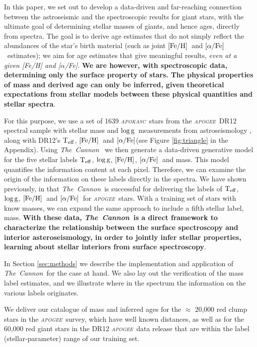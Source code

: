 \documentclass[12pt, preprint]{aastex}
\newcommand{\project}[1]{\textsl{#1}}
\newcommand{\tc}{\project{The~Cannon}}
\newcommand{\apogee}{\project{\textsc{apogee}}}
\newcommand{\apokasc}{\project{\textsc{apokasc}}}
\newcommand{\teff}{\mbox{$\rm T_{eff}$}}
\newcommand{\feh}{\mbox{$\rm [Fe/H]$}}
\newcommand{\alphafe}{\mbox{$\rm [\alpha/Fe]$}}
\newcommand{\logg}{\mbox{$\rm \log g$}}
\begin{document}
In this paper, we set out to develop a data-driven and far-reaching connection between the astroseismic and the spectroscopic results for giant stars, with the ultimate goal of determining stellar masses of giants, and hence ages, directly from spectra. The goal is to derive age estimates that do not simply reflect the abundances of the star's birth material (such as joint \feh\ and \alphafe\ estimates); we aim for age estimates that give meaningful results, {\sl even at a given [Fe/H] and [$\alpha$/Fe]}. \textbf{We are however, with spectroscopic data, determining only the surface property of stars. The physical properties of mass and derived age can only be inferred, given theoretical expectations from stellar models between these physical quantities and stellar spectra}.

For this purpose, we use a set of 1639 \apokasc\ stars from the \apogee\ DR12 spectral sample with stellar mass and \logg\ measurements from astroseismology \citep{P2014}, along with DR12's  \teff, \feh\ and \alphafe (see Figure \ref{fig:triangle} in the Appendix).  Using \tc~ \citep{Ness2015} we then generate a data-driven generative model for the five stellar labels \teff, \logg, \feh, \alphafe\ and mass. This model quantifies the information content at each pixel.  
Therefore, we can examine the origin of the information on these labels directly in the spectra. We have shown previously, in  \citet[][and Ho et al., in prep]{Ness2015}   that \tc\ is successful for delivering the labels of \teff, \logg, \feh\  and \alphafe\ for \apogee\ stars. With a training set of stars with know masses, we can expand the same approach to include a fifth stellar label, mass. \textbf{With these data,  \tc\ is a direct framework to characterize the relationship between the surface spectroscopy and interior asteroseismology, in order to jointly infer stellar properties, learning about stellar interiors from surface spectroscopy}.

In Section \ref{sec:methods} we describe the implementation and application of \tc\ for the case at hand. We also lay out the verification of the mass label estimates, and we illustrate where in the spectrum the information on the various labels originates. 

We deliver our catalogue of mass and inferred ages for the $\approx$ 20,000 red clump stars in the \apogee\ survey, which have well known distances, as well as for the 60,000 red giant stars in the DR12 \apogee\ data release that are within the label (stellar-parameter) range of our training set.
\end{document}
